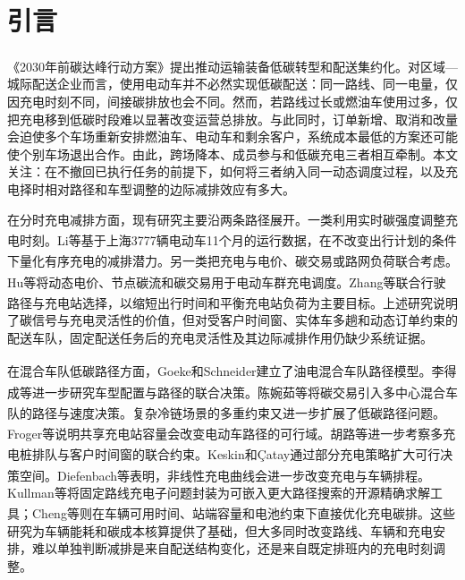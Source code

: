 \documentclass{setp-new}
\begin{document}
\maketitle
\clearpage


\section{引言}

《2030年前碳达峰行动方案》提出推动运输装备低碳转型和配送集约化\textsuperscript{\cite{ref:55}}。对区域—城际配送企业而言，使用电动车并不必然实现低碳配送：同一路线、同一电量，仅因充电时刻不同，间接碳排放也会不同。然而，若路线过长或燃油车使用过多，仅把充电移到低碳时段难以显著改变运营总排放。与此同时，订单新增、取消和改量会迫使多个车场重新安排燃油车、电动车和剩余客户，系统成本最低的方案还可能使个别车场退出合作。由此，跨场降本、成员参与和低碳充电三者相互牵制。本文关注：在不撤回已执行任务的前提下，如何将三者纳入同一动态调度过程，以及充电择时相对路径和车型调整的边际减排效应有多大。

在分时充电减排方面，现有研究主要沿两条路径展开。一类利用实时碳强度调整充电时刻\textsuperscript{\cite{ref:50}}。Li等基于上海3777辆电动车11个月的运行数据，在不改变出行计划的条件下量化有序充电的减排潜力\textsuperscript{\cite{ref:52}}。另一类把充电与电价、碳交易或路网负荷联合考虑。Hu等将动态电价、节点碳流和碳交易用于电动车群充电调度\textsuperscript{\cite{ref:53}}。Zhang等联合行驶路径与充电站选择，以缩短出行时间和平衡充电站负荷为主要目标\textsuperscript{\cite{ref:54}}。上述研究说明了碳信号与充电灵活性的价值，但对受客户时间窗、实体车多趟和动态订单约束的配送车队，固定配送任务后的充电灵活性及其边际减排作用仍缺少系统证据。

在混合车队低碳路径方面，Goeke和Schneider建立了油电混合车队路径模型\textsuperscript{\cite{ref:27}}。李得成等进一步研究车型配置与路径的联合决策\textsuperscript{\cite{ref:6}}。陈婉茹等将碳交易引入多中心混合车队的路径与速度决策\textsuperscript{\cite{ref:23}}。复杂冷链场景的多重约束又进一步扩展了低碳路径问题\textsuperscript{\cite{ref:48}}。Froger等说明共享充电站容量会改变电动车路径的可行域\textsuperscript{\cite{ref:12}}。胡路等进一步考察多充电桩排队与客户时间窗的联合约束\textsuperscript{\cite{ref:13}}。Keskin和\c{C}atay通过部分充电策略扩大可行决策空间\textsuperscript{\cite{ref:45}}。Diefenbach等表明，非线性充电曲线会进一步改变充电与车辆排程\textsuperscript{\cite{ref:46}}。Kullman等将固定路线充电子问题封装为可嵌入更大路径搜索的开源精确求解工具\textsuperscript{\cite{ref:73}}；Cheng等则在车辆可用时间、站端容量和电池约束下直接优化充电碳排\textsuperscript{\cite{ref:50}}。这些研究为车辆能耗和碳成本核算提供了基础，但大多同时改变路线、车辆和充电安排，难以单独判断减排是来自配送结构变化，还是来自既定排班内的充电时刻调整。
\end{document}
